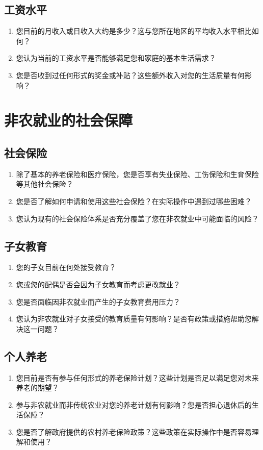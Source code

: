 \documentclass[12pt]{article}
\begin{document}
\subsection*{工资水平}
\begin{enumerate}
    \item 您目前的月收入或日收入大约是多少？这与您所在地区的平均收入水平相比如何？
    \item 您认为当前的工资水平是否能够满足您和家庭的基本生活需求？
    \item 您是否收到过任何形式的奖金或补贴？这些额外收入对您的生活质量有何影响？
\end{enumerate}

\section{非农就业的社会保障}

\subsection*{社会保险}
\begin{enumerate}
    \item 除了基本的养老保险和医疗保险，您是否享有失业保险、工伤保险和生育保险等其他社会保险？
    \item 您是否了解如何申请和使用这些社会保险？在实际操作中遇到过哪些困难？
    \item 您认为现有的社会保险体系是否充分覆盖了您在非农就业中可能面临的风险？
\end{enumerate}

\subsection*{子女教育}
\begin{enumerate}
    \item 您的子女目前在何处接受教育？
    \item 您或您的配偶是否会因为子女教育而考虑更改就业？
    \item 您是否面临因非农就业而产生的子女教育费用压力？
    \item 您认为非农就业对子女接受的教育质量有何影响？是否有政策或措施帮助您解决这一问题？
\end{enumerate}

\subsection*{个人养老}
\begin{enumerate}
    \item 您目前是否有参与任何形式的养老保险计划？这些计划是否足以满足您对未来养老的期望？
    \item 参与非农就业而非传统农业对您的养老计划有何影响？您是否担心退休后的生活保障？
    \item 您是否了解政府提供的农村养老保险政策？这些政策在实际操作中是否容易理解和使用？
\end{enumerate}
\end{document}

